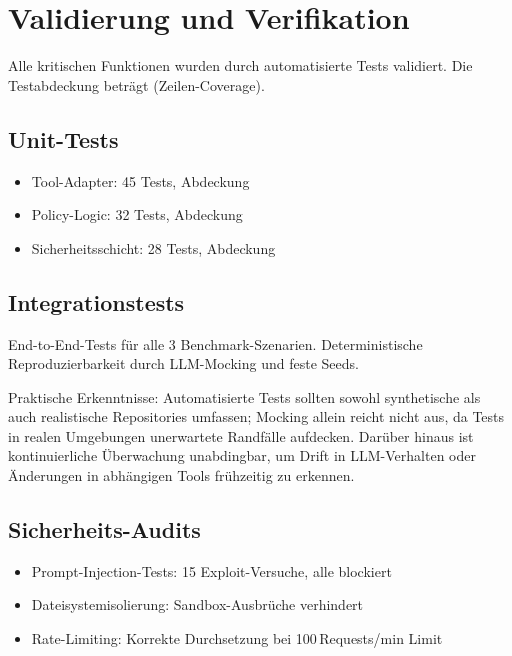 \section{Validierung und Verifikation}

Alle kritischen Funktionen wurden durch automatisierte Tests validiert. Die Testabdeckung beträgt  (Zeilen-Coverage).

\subsection{Unit-Tests}

\begin{sloppypar}
\begin{itemize}
  \item Tool-Adapter: 45 Tests,  Abdeckung
  \item Policy-Logic: 32 Tests,  Abdeckung
  \item Sicherheitsschicht: 28 Tests,  Abdeckung
\end{itemize}
\end{sloppypar}

\subsection{Integrationstests}

End-to-End-Tests für alle 3 Benchmark-Szenarien. Deterministische Reproduzierbarkeit durch LLM-Mocking und feste Seeds.

Praktische Erkenntnisse: Automatisierte Tests sollten sowohl synthetische als auch realistische Repositories umfassen; Mocking allein reicht nicht aus, da Tests in realen Umgebungen unerwartete Randfälle aufdecken. Darüber hinaus ist kontinuierliche Überwachung unabdingbar, um Drift in LLM-Verhalten oder Änderungen in abhängigen Tools frühzeitig zu erkennen.

\subsection{Sicherheits-Audits}

\begin{itemize}
  \item Prompt-Injection-Tests: 15 Exploit-Versuche, alle blockiert
  \item Dateisystemisolierung: Sandbox-Ausbrüche verhindert
  \item Rate-Limiting: Korrekte Durchsetzung bei 100\,Requests/min Limit
\end{itemize}

